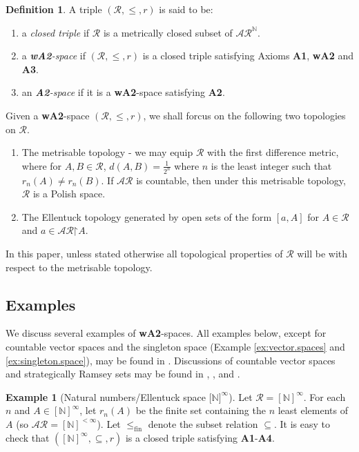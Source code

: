 \documentclass[11pt,reqno]{amsart}
\theoremstyle{plain}
\numberwithin{equation}{section}
\theoremstyle{definition}
\newtheorem{definition}[theorem]{Definition}
\newtheorem{example}[theorem]{Example}
\newcommand{\N}{\mathbb{N}}
\newcommand{\cal}{\mathcal}
\newcommand{\restrictedto}{\mathord{\upharpoonright}}
\newcommand{\fin}{\mathrm{fin}}
\begin{document}
\begin{definition}
    A triple $(\cal{R},\leq,r)$ is said to be:
    \begin{enumerate}
        \item a \emph{closed triple} if $\cal{R}$ is a metrically closed subset of $\cal{AR}^\N$.
        
        \item a \emph{\textbf{wA2}-space} if $(\cal{R},\leq,r)$ is a closed triple satisfying Axioms \textbf{A1}, \textbf{wA2} and \textbf{A3}.

        \item an \emph{\textbf{A2}-space} if it is a \textbf{wA2}-space satisfying \textbf{A2}.
    \end{enumerate}
\end{definition}

Given a \textbf{wA2}-space $(\cal{R},\leq,r)$, we shall forcus on the following two topologies on $\cal{R}$.
\begin{enumerate}
    \item The metrisable topology - we may equip $\cal{R}$ with the first difference metric, where for $A,B \in \cal{R}$, $d(A,B) = \frac{1}{2^n}$ where $n$ is the least integer such that $r_n(A) \neq r_n(B)$. If $\cal{AR}$ is countable, then under this metrisable topology, $\cal{R}$ is a Polish space.
    
    \item The Ellentuck topology generated by open sets of the form $[a,A]$ for $A \in \cal{R}$ and $a \in \cal{AR}\restrictedto A$.
\end{enumerate}

In this paper, unless stated otherwise all topological properties of $\cal{R}$ will be with respect to the metrisable topology.

\subsection{Examples}
We discuss several examples of \textbf{wA2}-spaces. All examples below, except for countable vector spaces and the singleton space (Example \ref{ex:vector.spaces} and \ref{ex:singleton.space}), may be found in \cite{T10}. Discussions of countable vector spaces and strategically Ramsey sets may be found in \cite{R08}, \cite{R09}, \cite{S18} and \cite{d20}. 

\begin{example}[Natural numbers/Ellentuck space $\lbrack \N\rbrack^\infty$]
\label{ex:natural.numbers}
    Let $\cal{R} = [\N]^\infty$. For each $n$ and $A \in [\N]^\infty$, let $r_n(A)$ be the finite set containing the $n$ least elements of $A$ (so $\cal{AR} = [\N]^{<\infty}$). Let $\leq_\fin$ denote the subset relation $\subseteq$. It is easy to check that $([\N]^\infty,\subseteq,r)$ is a closed triple satisfying \textbf{A1}-\textbf{A4}.
\end{example}
\end{document}
